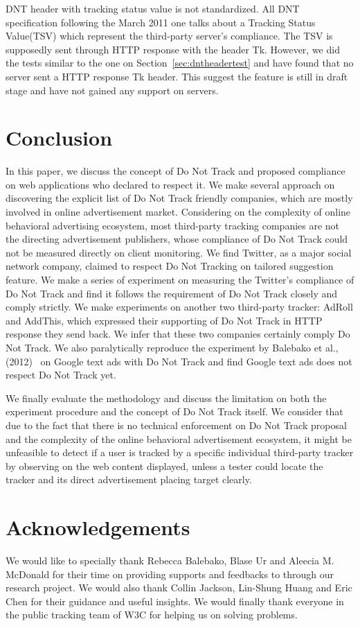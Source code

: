 \documentclass{sig-alternate}
\begin{document}
DNT header with tracking status value is not standardized. All DNT specification following the March 2011 one talks about a Tracking Status Value(TSV) which represent the third-party server’s compliance. The TSV is supposedly sent through HTTP response with the header Tk. However, we did the tests similar to the one on Section~\ref{sec:dntheadertest} and have found that no server sent a HTTP response Tk header. This suggest the feature is still in draft stage and have not gained any support on servers.

\section{Conclusion} \label{sec:conclusion}

In this paper, we discuss the concept of Do Not Track and proposed compliance on web applications who declared to respect it. We make several approach on discovering the explicit list of Do Not Track friendly companies, which are mostly involved in online advertisement market. Considering on the complexity of online behavioral advertising ecosystem, most third-party tracking companies are not the directing advertisement publishers, whose compliance of Do Not Track could not be measured directly on client monitoring. We find Twitter, as a major social network company, claimed to respect Do Not Tracking on tailored suggestion feature. We make a series of experiment on measuring the Twitter's compliance of Do Not Track and find it follows the requirement of Do Not Track closely and comply strictly. We make experiments on another two third-party tracker: AdRoll and AddThis, which expressed their supporting of Do Not Track in HTTP response they send back. We infer that these two companies certainly comply Do Not Track. We also paralytically reproduce the experiment by Balebako et al., (2012)~\cite{balebako2012measuring} on Google text ads with Do Not Track and find Google text ads does not respect Do Not Track yet. 

We finally evaluate the methodology and discuss the limitation on both the experiment procedure and the concept of Do Not Track itself. We consider that due to the fact that there is no technical enforcement on Do Not Track proposal and the complexity of the online behavioral advertisement ecosystem, it might be unfeasible to detect if a user is tracked by a specific individual third-party tracker by observing on the web content displayed, unless a tester could locate the tracker and its direct advertisement placing target clearly.

\section*{Acknowledgements}

We would like to specially thank Rebecca Balebako, Blase Ur and Aleecia M. McDonald for their time on providing supports and feedbacks to through our research project. We would also thank Collin Jackson, Lin-Shung Huang and Eric Chen for their guidance and useful insights. We would finally thank everyone in the public tracking team of W3C for helping us on solving problems.


\end{document}
